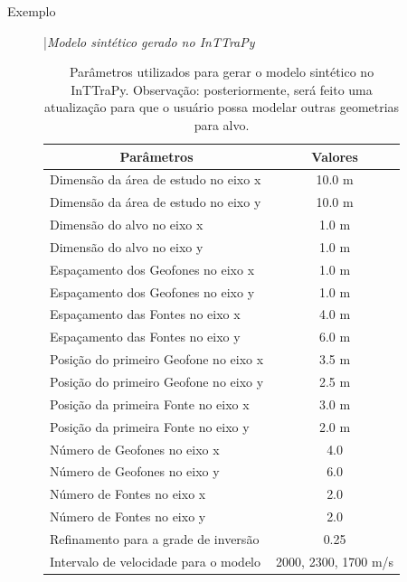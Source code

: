 \documentclass[a4paper, 12 pt]{article} %
\begin{document}
\begin{description}
	\item[Exemplo] |\textit{Modelo sintético gerado no InTTraPy} 
	
	\hspace{0.5cm} \blindtext 
	
	\begin{table}[!hbtp]
		\caption{Parâmetros utilizados para gerar o modelo sintético no InTTraPy. Observação: posteriormente, será feito uma atualização para que o usuário possa modelar outras geometrias para alvo.}
		\centering
		\label{parametros_dado_sintetico}
		\begin{tabular}{@{}lc@{}}
			\toprule
			\multicolumn{1}{c}{Parâmetros} &  
			\multicolumn{1}{c}{Valores}       \\ \midrule
			\rowcolor[HTML]{EFEFEF} 
			Dimensão da área de estudo no eixo x   
			&  10.0 m \\
			Dimensão da área de estudo no eixo y    
			&  10.0  m \\
			\rowcolor[HTML]{EFEFEF} 
			Dimensão do alvo no eixo x         
			&   1.0  m  \\
			Dimensão do alvo no eixo y          
			&    1.0 m   \\
			\rowcolor[HTML]{EFEFEF} 
			Espaçamento dos Geofones no eixo x 
			&  1.0 m  \\
			Espaçamento dos Geofones no eixo y         
			&   1.0 m   \\
			\rowcolor[HTML]{EFEFEF} 
			Espaçamento das Fontes no eixo x    
			&    4.0  m 	\\
			Espaçamento das Fontes no eixo y           
			&    6.0 m      \\
			\rowcolor[HTML]{EFEFEF} 
			Posição do primeiro Geofone no eixo x     
			&    3.5 m       \\
			Posição do primeiro Geofone no eixo y
		    &    2.5 m      \\
			\rowcolor[HTML]{EFEFEF} 
			Posição da primeira Fonte no eixo x    
			&     3.0 m   \\
			Posição da primeira Fonte no eixo y        
			&  2.0 m     \\
			\rowcolor[HTML]{EFEFEF} 
			Número de Geofones no eixo x     
			&    4.0   	\\
			Número de Geofones no eixo y
			&    6.0     \\
			\rowcolor[HTML]{EFEFEF} 
			Número de Fontes no eixo x     
			&    2.0    \\
			Número de Fontes no eixo y
			&    2.0    \\
			\rowcolor[HTML]{EFEFEF} 
			Refinamento para a grade de inversão     
			&     0.25              
			\\
			Intervalo de velocidade para o modelo 
			&    2000, 2300, 1700 m/s
			

\end{tabular}
\end{table}
\end{description}
\end{document}
